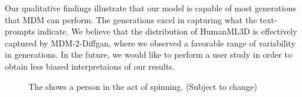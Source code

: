 \documentclass[10pt,twocolumn,letterpaper]{article}
\begin{document}
Our qualitative findings illustrate that our model is capable of most generations that MDM can perform. The generations excel in capturing what the text-prompts indicate. We believe that the 
distribution of HumanML3D is effectively captured by MDM-2-Diffgan, where we observed a favorable range of variability in generations. In the future, 
we would like to perform a user study in order to obtain less biased interpretaions of our results.
\begin{figure}[H]    
    \centering
    \caption{The shows a person in the act of spinning. (Subject to change)}    
    \label{fig:quant}
\end{figure}
\end{document}
